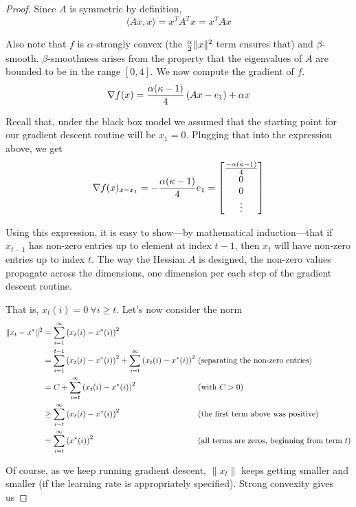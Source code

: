 \documentclass{article}
\begin{document}
\begin{proof}
Since $A$ is symmetric by definition,
\[	\langle Ax,x \rangle = x^TA^Tx = x^TAx \]

Also note that $f$ is $\alpha$-strongly convex (the ${\alpha \over 2} \|x\|^2$ term ensures that) and $\beta$-smooth. $\beta$-smoothness arises from the property that the eigenvalues of $A$ are bounded to be in the range $\left[ 0,4 \right]$. We now compute the gradient of $f$.
\[
\nabla f(x) = {\alpha (\kappa-1) \over 4} \left( Ax - e_1 \right) + \alpha x
\]    

Recall that, under the black box model we assumed that the starting point for our gradient descent routine will be $x_1 = 0$. Plugging that into the expression above, we get
\[
\nabla f(x)_{x = x_1} = -{\alpha (\kappa-1) \over 4} e_1 = \left[ \begin{matrix}
	-\alpha (\kappa-1) \over 4 \\ 0 \\ 0 \\ \vdots
	\end{matrix} \right]
\]

Using this expression, it is easy to show---by mathematical induction---that if $x_{t-1}$ has non-zero entries up to element at index $t-1$, then $x_{t}$ will have non-zero entries up to index $t$.
The way the Hessian $A$ is designed, the non-zero values propagate across the dimensions, one dimension per each step of the gradient descent routine.

That is, $x_t(i) = 0 \ \forall i \geq t$. Let's now consider the norm
\begin{equation}\label{normsumeq}
	\begin{alignedat}{2}
	\|x_t - x^*\|^2 & = \sum_{i=1}^{\infty} \left( x_t(i) - x^*(i) \right)^2 &&\\
	 & = \sum_{i=1}^{t-1} \left( x_t(i) - x^*(i) \right)^2 + \sum_{i=t}^{\infty} \left( x_t(i) - x^*(i) \right)^2 \ && \textnormal{(separating the non-zero entries)} \\
	  & = C + \sum_{i=t}^{\infty} \left( x_t(i) - x^*(i) \right)^2 &&\textnormal{(with $C > 0$)} \\
	  & \geq \sum_{i=t}^{\infty} \left( x_t(i) - x^*(i) \right)^2 &&\textnormal{(the first term above was positive)} \\
	   & = \sum_{i=t}^{\infty} \left(x^*(i) \right)^2 && \textnormal{(all terms are zeros, beginning from term $t$)}
	\end{alignedat}
\end{equation}
    
Of course, as we keep running gradient descent, $\|x_t\|$ keeps getting smaller and smaller (if the learning rate is appropriately specified). Strong convexity gives us


\end{proof}
\end{document}
